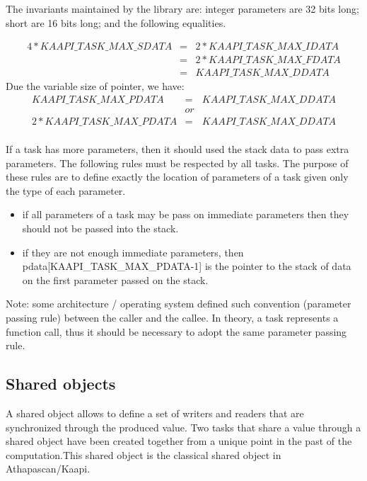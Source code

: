 \documentclass{report}
\begin{document}
The invariants maintained by the library are: integer parameters are 32 bits long; short are 16 bits long;  and the following equalities.
\begin{small}
$$
\begin{array}{ccc}
4 * KAAPI\_TASK\_MAX\_SDATA &   = & 2 * KAAPI\_TASK\_MAX\_IDATA \\
 & = & 2 * KAAPI\_TASK\_MAX\_FDATA \\
 & = &  KAAPI\_TASK\_MAX\_DDATA
\end{array}
$$
Due the variable size of pointer, we have:
$$ 
\begin{array}{ccc}
KAAPI\_TASK\_MAX\_PDATA &   = &  KAAPI\_TASK\_MAX\_DDATA \\
 & or &\\
2*KAAPI\_TASK\_MAX\_PDATA &   = &  KAAPI\_TASK\_MAX\_DDATA \\
\end{array}
$$
\end{small}

If a task has more parameters, then it should used the stack data to pass extra parameters. The following rules must be respected by all tasks. The purpose of these rules are to define exactly the location of parameters of a task given only the type
of each parameter.
\begin{itemize}
\item if all parameters of a task may be pass on immediate parameters then they should not be passed into the stack.
\item if they are not enough immediate parameters, then pdata[{\small KAAPI\_TASK\_MAX\_PDATA-1}] is the pointer to the stack of data on the first parameter passed on the stack.
\end{itemize}
Note: some architecture / operating system defined such convention (parameter passing rule) between the caller and the callee. In theory, a task represents a function call, thus it should be necessary to adopt the same parameter passing rule.


\subsection{Shared objects}
A shared object allows to define a set of writers and readers that are synchronized through the produced value.
Two tasks that share a value through a shared object have been created together from a unique point in the past of the computation.This shared object is the classical shared object in Athapascan/Kaapi.\\
\end{document}
